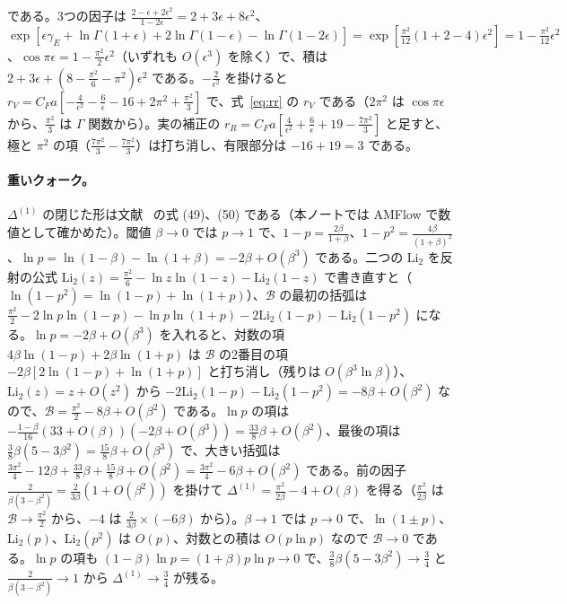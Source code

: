 \documentclass[a4paper,10pt]{ltjsarticle}
\begin{document}
である。3つの因子は $\frac{2-\epsilon+2\epsilon^2}{1-2\epsilon}=2+3\epsilon+8\epsilon^2$、$\exp[\epsilon\gamma_E+\ln\Gamma(1+\epsilon)+2\ln\Gamma(1-\epsilon)-\ln\Gamma(1-2\epsilon)]=\exp[\frac{\pi^2}{12}(1+2-4)\epsilon^2]=1-\frac{\pi^2}{12}\epsilon^2$、$\cos\pi\epsilon=1-\frac{\pi^2}2\epsilon^2$（いずれも $O(\epsilon^3)$ を除く）で、積は $2+3\epsilon+(8-\frac{\pi^2}6-\pi^2)\epsilon^2$ である。$-\frac2{\epsilon^2}$ を掛けると $r_V=C_Fa[-\frac4{\epsilon^2}-\frac6\epsilon-16+2\pi^2+\frac{\pi^2}3]$ で、式~\eqref{eq:rr} の $r_V$ である（$2\pi^2$ は $\cos\pi\epsilon$ から、$\frac{\pi^2}3$ は $\Gamma$ 関数から）。実の補正の $r_R=C_Fa[\frac4{\epsilon^2}+\frac6\epsilon+19-\frac{7\pi^2}3]$ と足すと、極と $\pi^2$ の項（$\frac{7\pi^2}3-\frac{7\pi^2}3$）は打ち消し、有限部分は $-16+19=3$ である。

\paragraph{重いクォーク。}$\Delta^{(1)}$ の閉じた形は文献~\cite{ht98} の式 (49)、(50) である（本ノートでは AMFlow で数値として確かめた）。閾値 $\beta\to0$ では $p\to1$ で、$1-p=\frac{2\beta}{1+\beta}$、$1-p^2=\frac{4\beta}{(1+\beta)^2}$、$\ln p=\ln(1-\beta)-\ln(1+\beta)=-2\beta+O(\beta^3)$ である。二つの $\mathrm{Li}_2$ を反射の公式 $\mathrm{Li}_2(z)=\frac{\pi^2}6-\ln z\ln(1-z)-\mathrm{Li}_2(1-z)$ で書き直すと（$\ln(1-p^2)=\ln(1-p)+\ln(1+p)$）、$\mathcal B$ の最初の括弧は $\frac{\pi^2}2-2\ln p\ln(1-p)-\ln p\ln(1+p)-2\mathrm{Li}_2(1-p)-\mathrm{Li}_2(1-p^2)$ になる。$\ln p=-2\beta+O(\beta^3)$ を入れると、対数の項 $4\beta\ln(1-p)+2\beta\ln(1+p)$ は $\mathcal B$ の2番目の項 $-2\beta[2\ln(1-p)+\ln(1+p)]$ と打ち消し（残りは $O(\beta^3\ln\beta)$）、$\mathrm{Li}_2(z)=z+O(z^2)$ から $-2\mathrm{Li}_2(1-p)-\mathrm{Li}_2(1-p^2)=-8\beta+O(\beta^2)$ なので、$\mathcal B=\frac{\pi^2}2-8\beta+O(\beta^2)$ である。$\ln p$ の項は $-\frac{1-\beta}{16}(33+O(\beta))(-2\beta+O(\beta^3))=\frac{33}8\beta+O(\beta^2)$、最後の項は $\frac38\beta(5-3\beta^2)=\frac{15}8\beta+O(\beta^3)$ で、大きい括弧は $\frac{3\pi^2}4-12\beta+\frac{33}8\beta+\frac{15}8\beta+O(\beta^2)=\frac{3\pi^2}4-6\beta+O(\beta^2)$ である。前の因子 $\frac2{\beta(3-\beta^2)}=\frac2{3\beta}(1+O(\beta^2))$ を掛けて $\Delta^{(1)}=\frac{\pi^2}{2\beta}-4+O(\beta)$ を得る（$\frac{\pi^2}{2\beta}$ は $\mathcal B\to\frac{\pi^2}2$ から、$-4$ は $\frac2{3\beta}\times(-6\beta)$ から）。$\beta\to1$ では $p\to0$ で、$\ln(1\pm p)$、$\mathrm{Li}_2(p)$、$\mathrm{Li}_2(p^2)$ は $O(p)$、対数との積は $O(p\ln p)$ なので $\mathcal B\to0$ である。$\ln p$ の項も $(1-\beta)\ln p=(1+\beta)p\ln p\to0$ で、$\frac38\beta(5-3\beta^2)\to\frac34$ と $\frac2{\beta(3-\beta^2)}\to1$ から $\Delta^{(1)}\to\frac34$ が残る。
\end{document}
